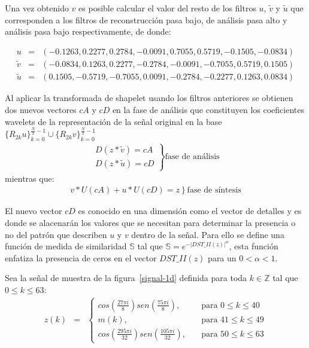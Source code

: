 \par Una vez obtenido $v$ es posible calcular el valor del resto de los filtros $u$, $\tilde{v}$ y $\tilde{u}$ que corresponden a los filtros de reconstrucci\'on pasa bajo, de an\'alisis pasa alto y an\'alisis pasa bajo respectivamente, de donde:

\begin{eqnarray}
u&=&(-0.1263,0.2277,0.2784,-0.0091,0.7055,0.5719,-0.1505,-0.0834)\nonumber\\
\tilde{v}&=&(-0.0834,0.1263,0.2277,-0.2784,-0.0091,-0.7055,0.5719,0.1505)\nonumber\\
\tilde{u}&=&(0.1505,-0.5719,-0.7055,0.0091,-0.2784,-0.2277,0.1263,0.0834)\nonumber
\end{eqnarray}

\par Al aplicar la transformada de shapelet usando los filtros anteriores se obtienen dos nuevos vectores $cA$ y $cD$ en la fase de an\'alisis que constituyen los coeficientes wavelets de la representaci\'on de la se\~nal original en la base $\{R_{2k}u\}_{k=0}^{\frac{N}{2}-1} \cup \{R_{2k}v\}_{k=0}^{\frac{N}{2}-1}$
\begin{eqnarray}
\left.\begin{array}{r}
D(z\ast\tilde{v})=cA\\
D(z\ast\tilde{u})=cD
\end{array}\right\}\mbox{fase de an\'alisis}\nonumber
\end{eqnarray}
mientras que:
\begin{eqnarray}
\left.v\ast U(cA)+u\ast U(cD)=z\right\}\mbox{fase de s\'intesis}\nonumber
\end{eqnarray}

\par El nuevo vector $cD$ es conocido en una dimensi\'on como el vector de detalles y es donde se alacenar\'an los valores que se necesitan para determinar la presencia o no del patr\'on que describen $u$ y $v$ dentro de la se\~nal. Para ello se define una funci\'on de medida de similaridad $\mathbb{S}$ tal que $\mathbb{S}=e^{-|DST\_II(z)|^{\alpha}}$, esta funci\'on enfatiza la presencia de ceros en el vector $DST\_II(z)$ para un $0<\alpha<1$.

\par Sea la se\~nal de muestra de la figura~\ref{signal-1d} definida para toda $k\in \mathbb{Z}$ tal que $0\leq k \leq 63$:
\begin{eqnarray}
z(k)&=&\left\{\begin{array}{ll}
cos\left(\frac{27\pi i}{8}\right)sen\left(\frac{75\pi i}{8}\right),&\quad\mbox{para $0\leq k \leq 40$}\\
m(k),&\quad\mbox{para $41 \leq k \leq 49$}\\
cos\left(\frac{295\pi i}{32}\right)sen\left(\frac{105\pi i}{32}\right),&\quad\mbox{para $50 \leq k \leq 63$}
\end{array}\right.\nonumber
\end{eqnarray}

